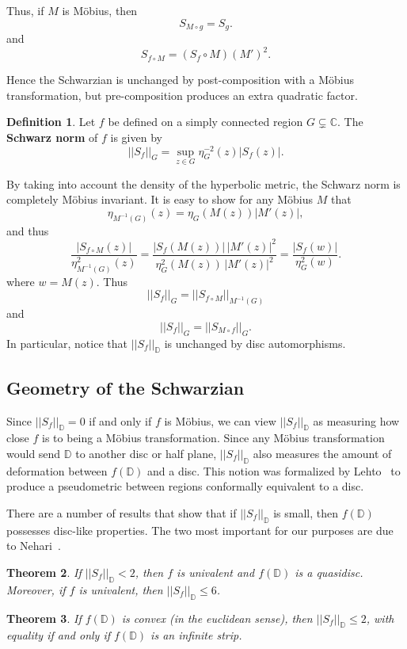 \documentclass[12pt]{icgft}
\newcommand{\C}{\mathbb C}
\newcommand{\D}{\mathbb D}
\newcommand{\abs}[1]{\lvert#1\rvert}
\newcommand{\norm}[1]{\lvert\lvert#1\rvert\rvert}
\newcommand{\Snf}{\norm{S_f}_\D}
\newtheorem{theorem}{Theorem}[section]
\theoremstyle{definition}
\newtheorem{definition}[theorem]{Definition}
\numberwithin{equation}{section}
\begin{document}
Thus, if $M$ is M\"obius, then
\[
S_{M\circ g} = S_g.
\]
and
\[
S_{f\circ M}=\left(S_f \circ M\right)\left(M'\right)^2.
\]

Hence the Schwarzian is unchanged by post-composition with a M\"obius
transformation, but pre-composition produces an extra quadratic factor.

\begin{definition}
Let $f$ be defined on a simply connected region $G\subsetneq\C$.
The \textbf{Schwarz norm} of $f$ is given by
\[
\norm{S_f}_{G} = \sup_{z \in G} \eta_G^{-2}(z)\abs{S_f (z)}.
\]
\end{definition}

By taking into account the density of the hyperbolic metric, the
Schwarz norm is completely M\"obius invariant.  It is easy to show
for any M\"obius $M$ that
\[
\eta_{M^{-1}(G)}(z)=\eta_{G} (M(z)) \abs{M'(z)},
\]
and thus
\[
\frac{\abs{S_{f\circ M}(z)}}{\eta^2_{M^{-1}(G)}(z)} =
\frac{\abs{S_f(M(z))}\,\abs{M'(z)}^2}{\eta^2_{G}(M(z))\,\abs{M'(z)}^2} =
\frac{\abs{S_f(w)}}{\eta^2_{G}(w)}.
\]
where $w=M(z)$.  Thus
\[
\norm{S_f}_G=\norm{S_{f\circ M}}_{M^{-1}(G)}
\]
and
\[
\norm{S_f}_G=\norm{S_{M\circ f}}_G.
\]
In particular, notice that $\norm{S_f}_\D$ is unchanged by disc
automorphisms.



\subsection{Geometry of the Schwarzian}

Since $\Snf=0$ if and only if $f$ is M\"obius, we can view
$\Snf$ as measuring how close $f$ is to being a M\"obius transformation.
Since any M\"obius transformation would send $\D$ to another disc or half plane,
$\Snf$ also measures the amount of deformation between $f(\D)$
and a disc.  This notion
was formalized by Lehto~\cite{oL87}
to produce a pseudometric between regions conformally equivalent to a disc.

There are a number of results that show that if $\norm{S_f}_\D$ is small,
then $f(\D)$ possesses disc-like properties.  The two most important
for our purposes are due to Nehari~\cite{zN49,zN76}.

\begin{theorem}  If $\Snf<2$, then $f$ is univalent and $f(\D)$ is a quasidisc.
Moreover, if $f$ is univalent, then $\Snf\leq 6$.
\end{theorem}

\begin{theorem} If $f(\D)$ is convex (in the euclidean sense),
 then $\Snf\leq 2$, with equality if and
only if $f(\D)$ is an infinite strip.
\end{theorem}
\end{document}
